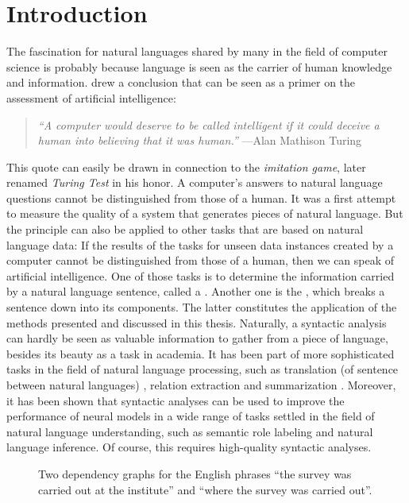 \documentclass[../document.tex]{subfiles}
\begin{document}
    \chapter{Introduction}
    The fascination for natural languages shared by many in the field of computer science is probably because language is seen as the carrier of human knowledge and information.
    \citet{Turing50} drew a conclusion that can be seen as a primer on the assessment of artificial intelligence:
    \begin{quote}
        \emph{``A computer would deserve to be called intelligent if it could deceive a human into believing that it was human.''} \hfill ---Alan Mathison Turing
    \end{quote}
    This quote can easily be drawn in connection to the \emph{imitation game}, later renamed \emph{Turing Test} in his honor.
    A computer's answers to natural language questions cannot be distinguished from those of a human.
    It was a first attempt to measure the quality of a system that generates pieces of natural language.
    But the principle can also be applied to other tasks that are based on natural language data:
        If the results of the tasks for unseen data instances created by a computer cannot be distinguished from those of a human, then we can speak of artificial intelligence.
    One of those tasks is to determine the information carried by a natural language sentence, called a .
    Another one is the , which breaks a sentence down into its components.
    The latter constitutes the application of the methods presented and discussed in this thesis.
    Naturally, a syntactic analysis can hardly be seen as valuable information to gather from a piece of language, besides its beauty as a task in academia.
    It has been part of more sophisticated tasks in the field of natural language processing, such as translation (of sentence between natural languages) \citep{Zhang19,Yang22}, relation extraction \citep{Ngu19} and summarization \citep{Bal21}.
    Moreover, it has been shown that syntactic analyses can be used to improve the performance of neural models in a wide range of tasks settled in the field of natural language understanding, such as semantic role labeling and natural language inference. \citep{Liu19, Wang19, Fei20}
    Of course, this requires high-quality syntactic analyses.
    
    \begin{figure}
        \null\hfill
        
        \hfill
        
        \hfill\null
        \caption{\label{fig:dependency}
            Two dependency graphs for the English phrases ``the survey was carried out at the institute'' and ``where the survey was carried out''.
        }
    \end{figure}
    
\end{document}
